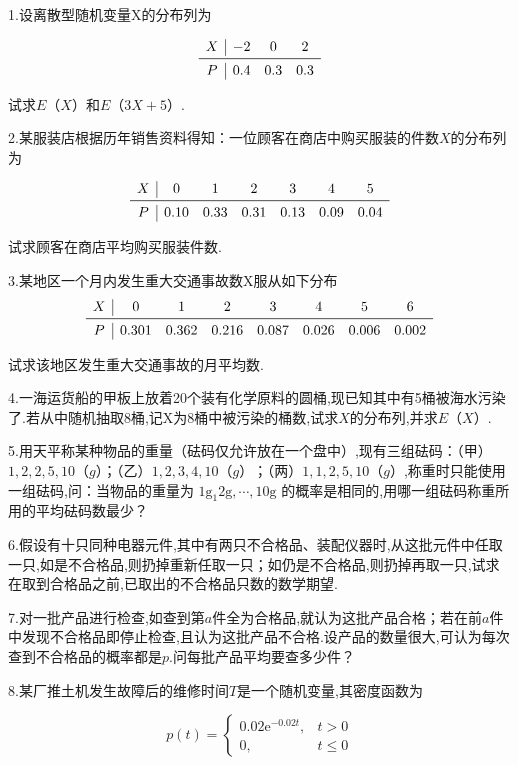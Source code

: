 1.设离散型随机变量X的分布列为

\[
\begin{array}{c|ccc}
X & {-2} & {0} & {2} \\ \midrule 
P & {0.4} & {0.3} & {0.3} \\ 
\end{array}
\]

试求$ E（X） $和$ E（3X+5） $.

2.某服装店根据历年销售资料得知：一位顾客在商店中购买服装的件数$ X $的分布列为

\[
\begin{array}{c|cccccc}
X & {0} & {1} & {2} & {3} & {4} & {5} \\ \midrule
P & {0.10} & {0.33} & {0.31} & {0.13} & {0.09} & {0.04}
\end{array}
\]

试求顾客在商店平均购买服装件数.

3.某地区一个月内发生重大交通事故数X服从如下分布
\[
\begin{array}{c|ccccccc}
X     & 0     & 1     & 2     & 3     & 4     & 5     & 6 \\\midrule
P     & 0.301 & 0.362 & 0.216 & 0.087 & 0.026 & 0.006 & 0.002 \\
\end{array}
\]


试求该地区发生重大交通事故的月平均数.

4.一海运货船的甲板上放着20个装有化学原料的圆桶,现已知其中有5桶被海水污染了.若从中随机抽取8桶,记X为8桶中被污染的桶数,试求$ X $的分布列,并求$ E（X） $.

5.用天平称某种物品的重量（砝码仅允许放在一个盘中）,现有三组砝码：（甲）$ 1,2,2,5,
10（g $）；（乙）$ 1,2,3,4,10（g） $；（两$ ）1,1,2,5,10（g） $,称重时只能使用一组砝码,问：当物品的重量为 $1 \mathrm{g}_{1} 2 \mathrm{g}, \cdots, 10 \mathrm{g}$ 的概率是相同的,用哪一组砝码称重所用的平均砝码数最少？

6.假设有十只同种电器元件,其中有两只不合格品、装配仪器时,从这批元件中任取一只,如是不合格品,则扔掉重新任取一只；如仍是不合格品,则扔掉再取一只,试求在取到合格品之前,已取出的不合格品只数的数学期望.

7.对一批产品进行检查,如查到第$ a $件全为合格品,就认为这批产品合格；若在前$ a $件中发现不合格品即停止检查,且认为这批产品不合格.设产品的数量很大,可认为每次查到不合格品的概率都是$ p $.问每批产品平均要查多少件？

8.某厂推土机发生故障后的维修时间$ T $是一个随机变量,其密度函数为

\[
p(t)=\left\{\begin{array}{ll}
{0.02 \mathrm{e}^{-0.02 t},} & {t>0} \\ 
{0,} & {t \leqslant 0}
\end{array}\right.
\]

